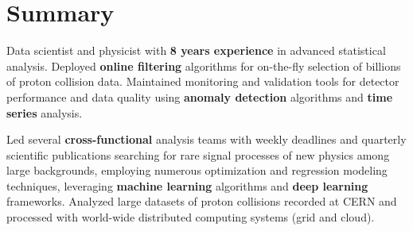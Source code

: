 \documentclass{myfancycv}
\begin{document}
\makeheader
\vspace*{-.35em}

  \vspace*{-0.5em}
\section{Summary}

Data scientist and physicist with {\bf 8 years experience} in advanced statistical analysis. Deployed {\bf online filtering} algorithms for on-the-fly selection of billions of proton collision data. Maintained monitoring and validation tools for detector performance and data quality using {\bf anomaly detection} algorithms and {\bf time series} analysis.

Led several {\bf cross-functional} analysis teams with weekly deadlines and quarterly scientific publications searching for rare signal processes of new physics among large backgrounds, employing numerous optimization and regression modeling techniques, leveraging {\bf machine learning} algorithms and {\bf deep learning} frameworks. Analyzed large datasets of proton collisions recorded at CERN and processed with world-wide distributed computing systems (grid and cloud).




\end{document}
